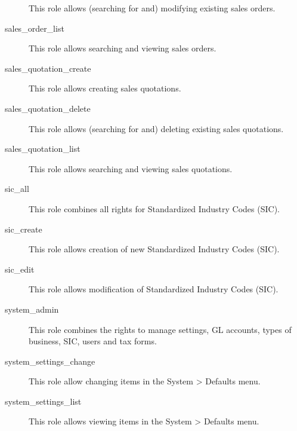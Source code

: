 \begin{description}
                         This role allows (searching for and) modifying existing sales orders.
\item [sales\_order\_list] \htmlspacing 
                         This role allows searching and viewing sales orders.
\item [sales\_quotation\_create] \htmlspacing 
                         This role allows creating sales quotations.
\item [sales\_quotation\_delete] \htmlspacing 
                         This role allows (searching for and) deleting existing sales quotations.
\item [sales\_quotation\_list] \htmlspacing 
                         This role allows searching and viewing sales quotations.
\item [sic\_all] \htmlspacing 
                         This role combines all rights for Standardized Industry
                         Codes (SIC).
\item [sic\_create] \htmlspacing 
                         This role allows creation of new Standardized Industry
                         Codes (SIC).
\item [sic\_edit] \htmlspacing 
                         This role allows modification of Standardized Industry
                         Codes (SIC).
\item [system\_admin] \htmlspacing 
                         This role combines the rights to manage settings,
                         \gls{GL}  accounts, types of business, SIC, users and tax
                         forms.
\item [system\_settings\_change] \htmlspacing 
                         This role allow changing items in the
                         System \textgreater{} Defaults menu.
\item [system\_settings\_list] \htmlspacing 
                         This role allows viewing items in the System \textgreater{} Defaults
                         menu.

\end{description}
